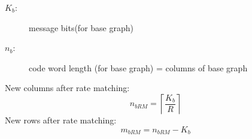 \begin{description}
    \item[$K_b$:] message bits(for base graph)
    \item[$n_b$:] code word length (for base graph) = columns of base graph
\end{description}
 
New columns after rate matching:
\begin{equation}
    \label{eq:New columns after rate matching}
    n_{bRM}=\left\lceil\frac{K_b}{R}\right\rceil
\end{equation}
New rows after rate matching:
\begin{equation}
    \label{eq:New rowa after rate matching}
    m_{bRM}=n_{bRM}-K_b
\end{equation}